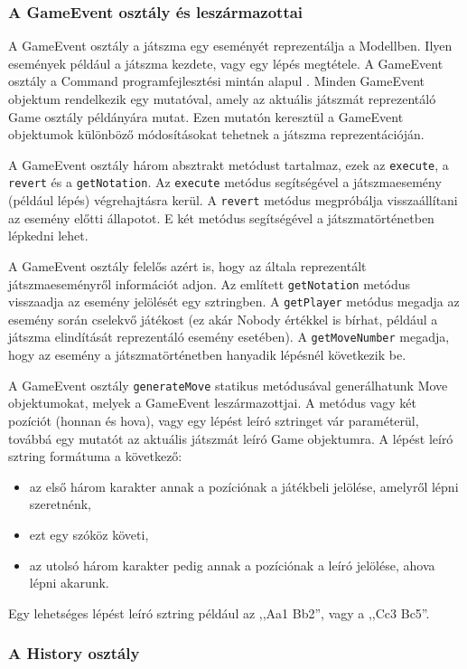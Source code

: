 \documentclass[12pt, twoside]{report}
\begin{document}
\subsubsection{A GameEvent osztály és leszármazottai}

A GameEvent osztály a játszma egy eseményét reprezentálja a Modellben. Ilyen események például a játszma kezdete, vagy egy lépés megtétele. A GameEvent osztály a Command programfejlesztési mintán alapul \cite[233]{designpatterns}. Minden GameEvent objektum rendelkezik egy mutatóval, amely az aktuális játszmát reprezentáló Game osztály példányára mutat. Ezen mutatón keresztül a GameEvent objektumok különböző módosításokat tehetnek a játszma reprezentációján.

A GameEvent osztály három absztrakt metódust tartalmaz, ezek az {\tt execute}, a {\tt revert} és a {\tt getNotation}. Az {\tt execute} metódus segítségével a játszmaesemény (például lépés) végrehajtásra kerül. A {\tt revert} metódus megpróbálja visszaállítani az esemény előtti állapotot. E két metódus segítségével a játsz\-ma\-tör\-té\-net\-ben lépkedni lehet.

A GameEvent osztály felelős azért is, hogy az általa reprezentált játszmaeseményről információt adjon. Az említett {\tt getNotation} metódus visszaadja az esemény jelölését egy sztringben. A {\tt getPlayer} metódus megadja az esemény során cselekvő játékost (ez akár Nobody értékkel is bírhat, például a játszma elindítását reprezentáló esemény esetében). A {\tt getMoveNumber} megadja, hogy az esemény a játszmatörténetben hanyadik lépésnél következik be.

A GameEvent osztály {\tt generateMove} statikus metódusával generálhatunk Move objektumokat, melyek a GameEvent leszármazottjai. A metódus vagy két pozíciót (honnan és hova), vagy egy lépést leíró sztringet vár paraméterül, továbbá egy mutatót az aktuális játszmát leíró Game objektumra. A lépést leíró sztring formátuma a következő:
\begin{itemize}
	\item az első három karakter annak a pozíciónak a játékbeli jelölése, amelyről lépni szeretnénk,
	\item ezt egy szóköz követi,
	\item az utolsó három karakter pedig annak a pozíciónak a leíró jelölése, ahova lépni akarunk.
\end{itemize}
Egy lehetséges lépést leíró sztring például az ,,Aa1 Bb2'', vagy a ,,Cc3 Bc5''.

\subsubsection{A History osztály}
\end{document}
